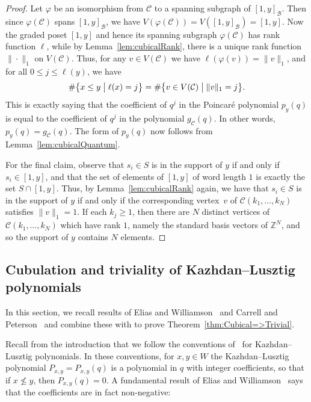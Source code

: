 \documentclass[11pt]{amsart}
\theoremstyle{plain}
\theoremstyle{definition}
\newcommand{\cC}{\mathcal{C}}
\newcommand{\Z}{\mathbb{Z}}
\newcommand{\cB}{\mathcal B}
\newcommand{\Pxy}{P_{x,y}} %
\numberwithin{equation}{subsection}
\begin{document}
\begin{proof} Let $\varphi$ be an isomorphism from $\cC$ to a spanning subgraph of $[1,y]_\cB$. Then since $\varphi(\cC)$ spans $[1,y]_\cB$, we have $V(\varphi(\cC)) = V([1,y]_\cB) = [1,y]$. Now the graded poset $[1,y]$ and hence its spanning subgraph $\varphi(\cC)$ has rank function $\ell$, while by Lemma~\ref{lem:cubicalRank}, there is a unique rank function $\| \cdot \|_1$ on $V(\cC)$.  Thus, for any $v \in V(\cC)$ we have $\ell(\varphi(v)) = \| v \|_1$, and for all $0 \leq j \leq \ell(y)$, we have
\[
\# \bigl\{ x \leq y \bigm| \ell(x) = j \bigr\} = \# \bigl\{ v \in V(\cC) \bigm| \| v \|_1 = j \bigr\}.
\]
This is exactly saying that the coefficient of $q^j$ in the Poincar\'e polynomial $p_y(q)$ is equal to the coefficient of $q^j$ in the polynomial $g_\cC(q)$. In other words, $p_y(q) = g_\cC(q)$. The form of $p_y(q)$ now follows from Lemma~\ref{lem:cubicalQuantum}. 

For the final claim, observe that $s_i \in S$ is in the support of $y$ if and only if $s_i \in [1,y]$, and that the set of elements of $[1,y]$ of word length $1$ is exactly the set $S \cap [1,y]$. Thus, by Lemma~\ref{lem:cubicalRank} again, we have that $s_i \in S$ is in the support of $y$ if and only if the corresponding vertex~$v$ of $\cC(k_1,\dots,k_N)$ satisfies $\| v \|_1 = 1$. If each $k_j \geq 1$, then there are $N$ distinct vertices of $\cC(k_1,\dots,k_N)$ which have rank $1$, namely the standard basis vectors of $\Z^N$, and so the support of $y$ contains $N$ elements.
\end{proof}


\subsection{Cubulation and triviality of Kazhdan--Lusztig polynomials}\label{sec:KL}

In this section, we recall results of Elias and Williamson~\cite{EliasWilliamson} and Carrell and Peterson~\cite{Carrell} and combine these with  to prove Theorem~\ref{thm:Cubical=>Trivial}. 

Recall from the introduction that we follow the conventions of~\cite{BjoernerBrenti} for Kazhdan--Lusztig polynomials.  In these conventions, for $x, y \in W$ the Kazhdan--Lusztig polynomial $P_{x,y} = P_{x,y}(q)$ is a polynomial in $q$ with integer coefficients, so that if $x \not \leq y$, then $\Pxy(q) = 0$.
A fundamental result of Elias and Williamson~\cite{EliasWilliamson} says that the coefficients are in fact non-negative: 
\end{document}
